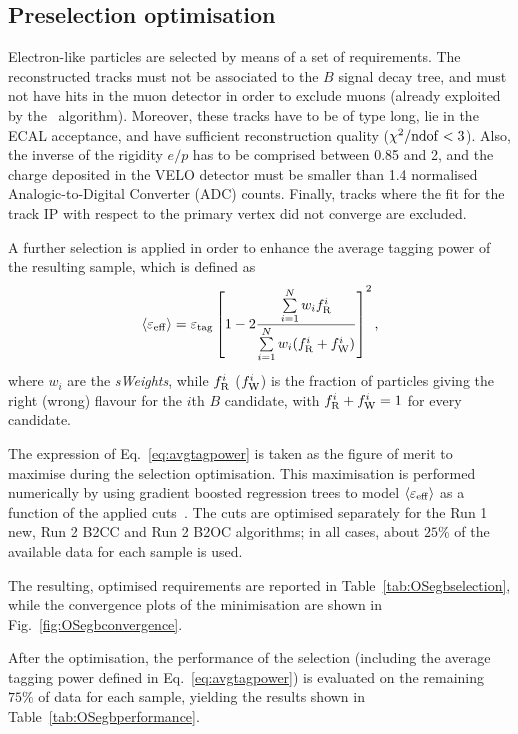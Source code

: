 
\subsection{Preselection optimisation}
\label{sec:tagging:OSePresel}

Electron-like particles are selected by means of a set of requirements. The reconstructed tracks must not be associated to
the $B$ signal decay tree,
and must not have hits in the muon detector in order to exclude muons (already exploited by the \OSmu~algorithm).
Moreover, these tracks have to be of type long, lie in the ECAL acceptance, and have sufficient reconstruction quality ($\chi^2/\rm ndof<3$). 
Also, the inverse of the rigidity $e/p$ has to be comprised between 0.85 and 2, and the charge deposited in the VELO detector must be
smaller than 1.4 normalised Analogic-to-Digital Converter (ADC) counts.
Finally, tracks where the fit for the track IP with respect to the primary vertex did not converge are excluded. 

A further selection is applied in order to enhance the average tagging power of the resulting sample, which is defined as
\begin{equation}
        \label{eq:avgtagpower}
        \left< \varepsilon_{\rm eff} \right> = \varepsilon_\text{tag} \left[1 - 2 \frac{\sum\limits_{i=1}^N w_i f^i_{\rm R}}{\sum\limits_{i=1}^N w_i (f^i_{\rm R} + f^i_{\rm W})}\right]^2,
\end{equation}
where $w_i$ are the \emph{sWeights}, while $f^i_{\rm R}$ ($f^i_{\rm W}$) is the fraction of particles giving the right (wrong) flavour for the $i$th $B$ candidate, with $f^i_{\rm R}+f^i_{\rm W}=1$ for every candidate.

The expression of Eq.~\ref{eq:avgtagpower} is taken as the figure of merit to maximise during the selection optimisation. This maximisation is performed numerically by using gradient boosted regression trees to model $\left< \varepsilon_{\rm eff} \right>$ as a function of the applied cuts~\cite{scikit-optimize}. The cuts are optimised separately for the Run 1 new, Run 2 B2CC and Run 2 B2OC algorithms; in all cases, about $25\%$ of the available data for each sample is used. 

The resulting, optimised requirements are reported in Table~\ref{tab:OSegbselection}, while the convergence plots of the minimisation are shown in Fig.~\ref{fig:OSegbconvergence}.

After the optimisation, the performance of the selection (including the average tagging power defined in Eq.~\ref{eq:avgtagpower}) is evaluated on the remaining $75\%$ of data for each sample, yielding the results shown in Table~\ref{tab:OSegbperformance}.

